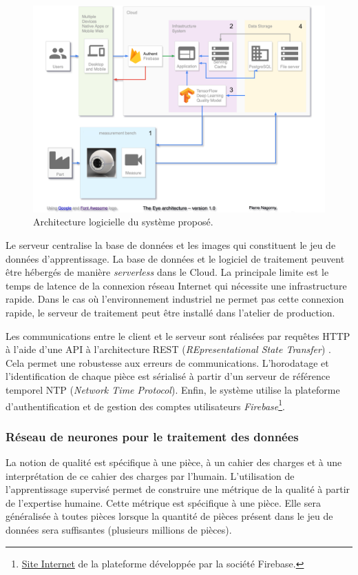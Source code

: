 \begin{figure}[tbh]
	\centering
	\includegraphics[width=\textwidth,height=\textheight,keepaspectratio]{../Chap5/Figures/TE_architecture.pdf}
	\caption{Architecture logicielle du système proposé.}
	\label{fig:architecture}
\end{figure}


Le serveur centralise la base de données et les images qui constituent le jeu de données d'apprentissage.
La base de données et le logiciel de traitement peuvent être hébergés de manière \textit{serverless} dans le Cloud.
La principale limite est le temps de latence de la connexion réseau Internet qui nécessite une infrastructure rapide.
Dans le cas où l'environnement industriel ne permet pas cette connexion rapide, le serveur de traitement peut être installé dans l'atelier de production.

Les communications entre le client et le serveur sont réalisées par requêtes HTTP à l'aide d'une API à l'architecture REST (\textit{REpresentational State Transfer}) \cite{fielding_architectural_2000}.
Cela permet une robustesse aux erreurs de communications.
L'horodatage et l'identification de chaque pièce est sérialisé à partir d'un serveur de référence temporel NTP (\textit{Network Time Protocol}).
Enfin, le système utilise la plateforme d'authentification et de gestion des comptes utilisateurs \textit{Firebase}\footnote{\href{https://firebase.google.com/}{Site Internet} de la plateforme développée par la société Firebase.}.

\subsubsection{Réseau de neurones pour le traitement des données} \label{neural_fusion}
La notion de qualité est spécifique à une pièce, à un cahier des charges et à une interprétation de ce cahier des charges par l’humain. L’utilisation de l’apprentissage supervisé permet de construire une métrique de la qualité à partir de l’expertise humaine. Cette métrique est spécifique à une pièce. Elle sera généralisée à toutes pièces lorsque la quantité de pièces présent dans le jeu de données sera suffisantes (plusieurs millions de pièces).

